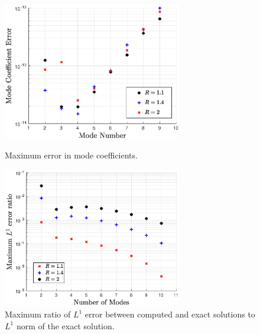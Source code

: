 \begin{figure}[ht]
\begin{minipage}[t]{0.5\linewidth}
\centerline{\includegraphics[height=6cm]{06-appendix/SpectralMethodBoltzmann/Figures/keq_b_err.eps}}
\caption{Maximum error in mode coefficients.}\label{fig:keq_b_err}
 \end{minipage}
 \hspace{0.5cm}
 \begin{minipage}[t]{0.5\linewidth}
\centerline{\includegraphics[height=6.1cm]{06-appendix/SpectralMethodBoltzmann/Figures/keq_L1_err.eps}}
\caption{Maximum ratio of $L^1$ error between computed and exact solutions to $L^1$ norm of the exact solution.}\label{fig:keq_L1_err}
\end{minipage}
\end{figure}


